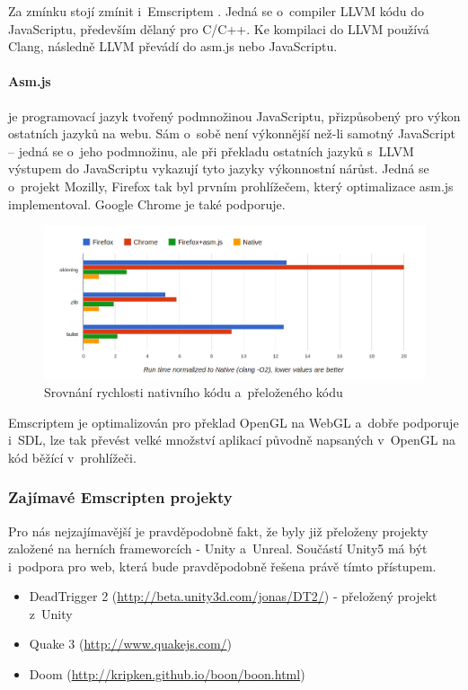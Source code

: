 \documentclass[12pt,a4paper,titlepage,final]{report}
\begin{document}
Za zmínku stojí zmínit i~Emscriptem \cite{emscripten-pres}. Jedná se o~compiler LLVM kódu do JavaScriptu, především dělaný pro C/C++. Ke kompilaci do LLVM používá Clang, následně LLVM převádí do asm.js nebo JavaScriptu.

\paragraph{Asm.js} \cite{asmjs} je programovací jazyk tvořený podmnožinou JavaScriptu, přizpůsobený pro výkon ostatních jazyků na webu. Sám o~sobě není výkonnější než-li samotný JavaScript -- jedná se o~jeho podmnožinu, ale při překladu ostatních jazyků s~LLVM výstupem do JavaScriptu vykazují tyto jazyky výkonnostní nárůst. Jedná se o~projekt Mozilly, Firefox tak byl prvním prohlížečem, který optimalizace asm.js implementoval. Google Chrome je také podporuje.

\begin{figure}[ht]
\begin{center}
\includegraphics[width=14cm]{images/micro3b.png}
\caption{Srovnání rychlosti nativního kódu a~přeloženého kódu}
\label{fig:theory}
\end{center}
\end{figure}

Emscriptem je optimalizován pro překlad OpenGL na WebGL a~dobře podporuje i~SDL, lze tak převést velké množství aplikací původně napsaných v~OpenGL na kód běžící v~prohlížeči.

\subsubsection{Zajímavé Emscripten projekty}

Pro nás nejzajímavější je pravděpodobně fakt, že byly již přeloženy projekty založené na herních frameworcích - Unity \cite{unity} a~Unreal. Součástí Unity5 má být i~podpora pro web, která bude pravděpodobně řešena právě tímto přístupem.

\begin{itemize}
	\item DeadTrigger 2 (\url{http://beta.unity3d.com/jonas/DT2/}) - přeložený projekt z~Unity
	\item Quake 3 (\url{http://www.quakejs.com/})
	\item Doom (\url{http://kripken.github.io/boon/boon.html})
\end{itemize}
\end{document}
